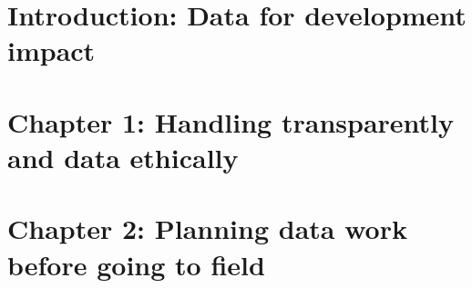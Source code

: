 %
%
%
%




\cleardoublepage
\chapter{Introduction: Data for development impact} %





\chapter{Chapter 1: Handling transparently and data ethically}
\label{ch:1}




\chapter{Chapter 2: Planning data work before going to field}
\label{ch:2}




